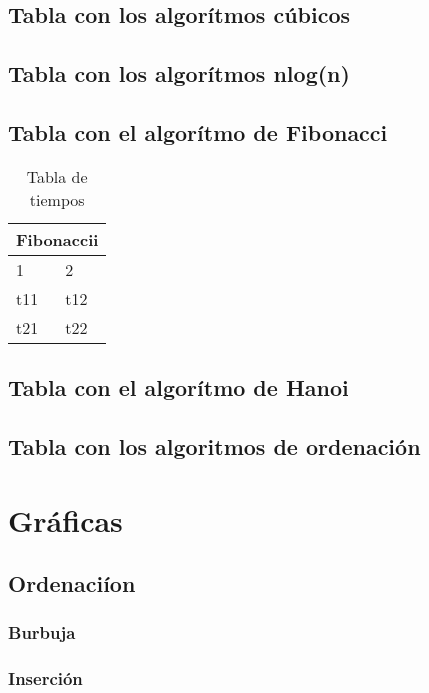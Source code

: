 \documentclass[11pt,spanish]{article} %
\begin{document}
\subsection{Tabla con los algor\'itmos c\'ubicos}
\subsection{Tabla con los algor\'itmos nlog(n)}
\subsection{Tabla con el algor\'itmo de Fibonacci}
\begin{table}[htb]
\centering
\begin{tabular}{|l|l|}
\hline
\multicolumn{2}{|c|}{Fibonaccii} \\ \hline
1 & 2 \\
\hline \hline
t11 & t12 \\ \hline
t21 & t22 \\ \hline
\end{tabular}
\caption{Tabla de tiempos}
\label{tabla:fib}
\end{table}

\subsection{Tabla con el algor\'itmo de Hanoi}
\subsection{Tabla con los algoritmos de ordenaci\'on}

\newpage

\section{Gr\'aficas}

\subsection{Ordenaci\'ion}
\subsubsection{Burbuja}
\subsubsection{Inserci\'on}
\end{document}
